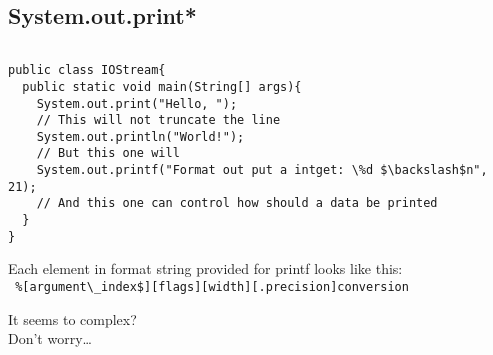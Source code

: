\documentclass[en, 11pt, xcolor=dvipsnames]{beamer}
\begin{document}
\subsection{System.out.print*}
\begin{frame}[fragile]


	\begin{columns}[c]
		\begin{column}{0.9\textwidth}

			\begin{lstlisting}[style=Java]
public class IOStream{
  public static void main(String[] args){
    System.out.print("Hello, ");
    // This will not truncate the line
    System.out.println("World!");
    // But this one will
    System.out.printf("Format out put a intget: \%d $\backslash$n", 21);
    // And this one can control how should a data be printed
  }
}\end{lstlisting}

			Each element in format string provided for printf looks like this:\\

			{\verb- %[argument\_index$][flags][width][.precision]conversion -}

			It seems to complex?\\

			Don't worry\dots


		\end{column}
	\end{columns}

\end{frame}
\end{document}
